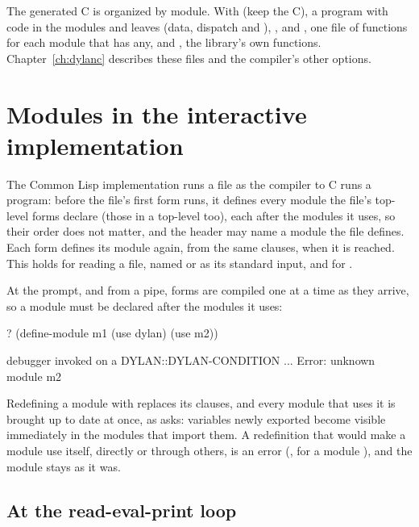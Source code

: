 The generated C is organized by module. With  (keep the C), a
program  with code in the modules  and 
leaves  (data, dispatch and ), ,
 and , one file of functions for each
module that has any, and , the library's own functions.
Chapter~\ref{ch:dylanc} describes these files and the compiler's other
options.

\section{Modules in the interactive implementation}\label{sec:modules-lisp}

The Common Lisp implementation runs a file as the compiler to C runs a
program: before the file's first form runs, it defines every module the
file's top-level  forms declare (those in a top-level
 too), each after the modules it uses, so their order does
not matter, and the header may name a module the file defines. Each
 form defines its module again, from the same
clauses, when it is reached. This holds for  reading a
file, named or as its standard input, and for .

At the  prompt, and from a pipe, forms are compiled one at a time
as they arrive, so a module must be declared after the modules it uses:

\begin{repl}
? (define-module m1 (use dylan) (use m2))

debugger invoked on a DYLAN::DYLAN-CONDITION ...
  Error: unknown module m2
\end{repl}

\noindent
Redefining a module with  replaces its clauses, and every module that uses it
is brought up to date at once, as  asks: variables
newly exported become visible immediately in the modules that import
them. A redefinition that would make a module use itself, directly or
through others, is an error (, for a module ), and the module stays as it was.

\subsection{At the read-eval-print loop}

